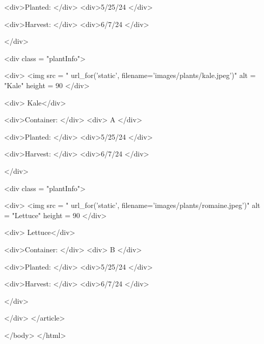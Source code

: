 \documentclass[12pt]{article} %
\begin{document}
\begin{htmlcode}[caption={Plant Page HTML}]
          <div>Planted: </div>
          <div>5/25/24 </div>
    
          <div>Harvest: </div>
          <div>6/7/24 </div>
    
         </div>
    
         <div class = "plantInfo">
    
          <div>
             <img src = "{{ url_for('static', filename='images/plants/kale.jpeg')}}" alt = "Kale" height = 90%
          </div>
         
          <div> Kale</div>
    
          <div>Container: </div>
          <div> A </div>
    
          <div>Planted: </div>
          <div>5/25/24 </div>
    
          <div>Harvest: </div>
          <div>6/7/24 </div>
    
         </div>
    
         <div class = "plantInfo">
    
          <div>
             <img src = "{{ url_for('static', filename='images/plants/romaine.jpeg')}}" alt = "Lettuce" height = 90%
          </div>
         
          <div> Lettuce</div>
    
          <div>Container: </div>
          <div> B </div>
    
          <div>Planted: </div>
          <div>5/25/24 </div>
    
          <div>Harvest: </div>
          <div>6/7/24 </div>
    
         </div>
    
        </div>
        </article> 
    
    </body>
    </html>
    
    \end{htmlcode}
    
    \pagebreak
    
\end{document}
